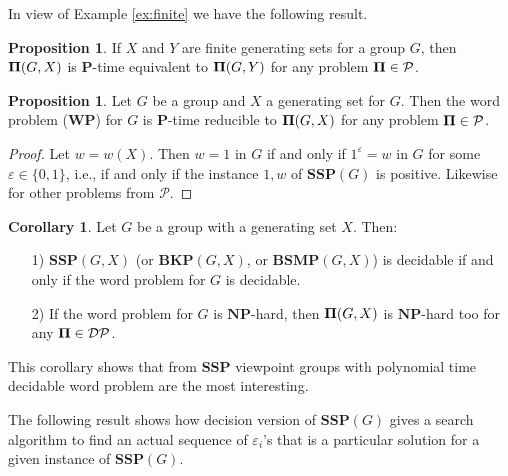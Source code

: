 \documentclass[11pt]{amsart}
\theoremstyle{definition}
\newtheorem{proposition}[theorem]{Proposition}
\newtheorem{corollary}[theorem]{Corollary}
\def\P{{\mathbf{P}}}
\def\NP{{\mathbf{NP}}}
\def\WP{{\mathbf{WP}}}
\def\SSP{{\mathbf{SSP}}}
\def\BSMP{{\mathbf{BSMP}}}
\def\BKP{{\mathbf{BKP}}}
\begin{document}
In view of Example \ref{ex:finite} we have the following result.

\begin{proposition}\label{le:FiniteX_independence}
If $X$ and $Y$ are finite generating sets for a group $G$, then  ${\bf \Pi}(G,X)$ is $\P$-time  equivalent  to ${\bf \Pi}(G,Y)$ for any problem ${\bf \Pi} \in \mathcal{P}$.
\end{proposition}

\begin{proposition}
Let $G$ be a group and $X$ a generating set for $G$.
Then the  word problem ($\WP$) for $G$ is $\P$-time reducible to ${\bf \Pi}(G,X)$ for any problem ${\bf \Pi} \in \mathcal{P}$.
\end{proposition}

\begin{proof}
Let $w=w(X)$.
Then $w=1$ in $G$ if and only if $1^\varepsilon  = w$ in $G$ for some $\varepsilon \in \{0,1\}$, i.e.,
if and only if the instance $1,w$ of $\SSP(G)$ is positive. Likewise for other problems from ${\mathcal P}$.
\end{proof}

\begin{corollary}
Let $G$ be a group with a generating set $X$. Then:

\begin{enumerate}
\item [1)] $\SSP(G,X)$ (or $\BKP(G,X)$, or $\BSMP(G,X)$) is decidable if and only if the word problem
for $G$ is decidable.
\item [2)] If the word problem for $G$ is $\NP$-hard,
then ${\bf \Pi}(G,X)$ is $\NP$-hard too for any ${\bf \Pi} \in \mathcal{DP}$.
\end{enumerate}
\end{corollary}

This corollary shows that from $\SSP$ viewpoint groups with polynomial time decidable word problem are the most interesting.

The following result shows how decision version of $\SSP(G)$ gives a search  algorithm to find an actual sequence of $\varepsilon_i$'s that is a particular solution for a given instance of $\SSP(G)$.
\end{document}
